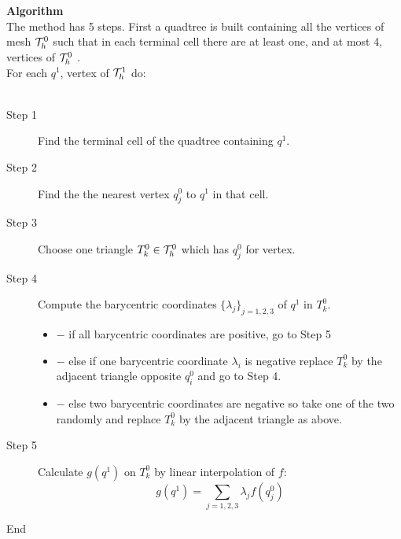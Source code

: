 \documentclass[a4paper,twoside,12pt]{book}
\begin{document}
{\bf Algorithm }\\
 The method has 5 steps.
  First a quadtree is built containing all the vertices of mesh ${\cal T}_{h}^0$ such that in
 each terminal cell there are at least one, and at most 4, vertices of ${\cal T}_{h}^0$ .\\
For each $q^1$, vertex of ${\cal T}_{h}^1$ do:
\\\\
\begin{description}
\item[Step 1]
Find the terminal cell of the quadtree containing $q^1$.
 \item[Step 2] Find the the nearest vertex $q^0_j$ to $q^1$ in that cell.
 \item[Step 3] Choose one triangle $T_k^0\in{\cal T}_{h}^0$ which has $q^0_j$ for vertex.
 \item[Step 4] Compute the barycentric coordinates $\{\lambda_j\}_{j=1,2,3}
 $ of $q^1$ in $T^0_k$.
\begin{itemize}
 \item{$-$} if all barycentric coordinates are positive, go to Step 5
 \item{$-$} else if one barycentric coordinate $\lambda_i$ is negative replace $T^0_k$ by the
 adjacent triangle opposite $q^0_i$ and go to Step 4.
 \item{$-$} else two barycentric coordinates are negative so take one of the two randomly
 and replace $T^0_k$ by the adjacent triangle as above.
\end{itemize}
  \item[Step 5] Calculate $g(q^1)$ on $T^0_k$ by linear interpolation of $f$:
 $$
 g(q^1) = \sum_{j=1,2,3} \lambda_j f(q^0_j)
 $$
 \item[End]~
\end{description}
\end{document}
